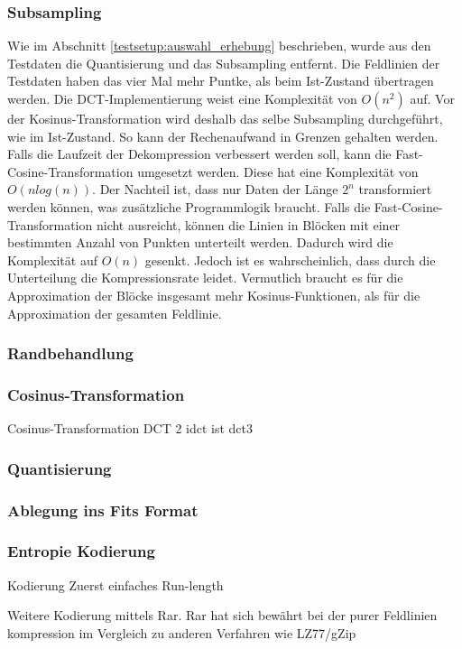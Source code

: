 \subsubsection{Subsampling} \label{konzept:loesung1:subsampling}
Wie im Abschnitt \ref{testsetup:auswahl_erhebung} beschrieben, wurde aus den Testdaten die Quantisierung und das Subsampling entfernt. Die Feldlinien der Testdaten haben das vier Mal mehr Puntke, als beim Ist-Zustand übertragen werden. Die DCT-Implementierung weist eine Komplexität von $O(n^2)$ auf. Vor der Kosinus-Transformation wird deshalb das selbe Subsampling durchgeführt, wie im Ist-Zustand. So kann der Rechenaufwand in Grenzen gehalten werden.\\
Falls die Laufzeit der Dekompression verbessert werden soll, kann die Fast-Cosine-Transformation umgesetzt werden. Diese hat eine Komplexität von $O(n log(n))$. Der Nachteil ist, dass nur Daten der Länge $2^n$ transformiert werden können, was zusätzliche Programmlogik braucht. Falls die Fast-Cosine-Transformation nicht ausreicht, können die Linien in Blöcken mit einer bestimmten Anzahl von Punkten unterteilt werden. Dadurch wird die Komplexität auf $O(n)$ gesenkt. Jedoch ist es wahrscheinlich, dass durch die Unterteilung die Kompressionsrate leidet. Vermutlich braucht es für die Approximation der Blöcke insgesamt mehr Kosinus-Funktionen, als für die Approximation der gesamten Feldlinie.\\

\subsubsection{Randbehandlung} \label{konzept:loesung1:randbehandlung}

\subsubsection{Cosinus-Transformation} \label{konzept:loesung1:kosinus}
Cosinus-Transformation
	DCT 2
	idct ist dct3
	
\subsubsection{Quantisierung}

\subsubsection{Ablegung ins Fits Format}

\subsubsection{Entropie Kodierung}\label{konzept:loesung1:kodierung}
Kodierung
	Zuerst einfaches Run-length

	Weitere Kodierung mittels Rar.
		Rar hat sich bewährt bei der purer Feldlinien kompression im Vergleich zu anderen Verfahren wie LZ77/gZip





